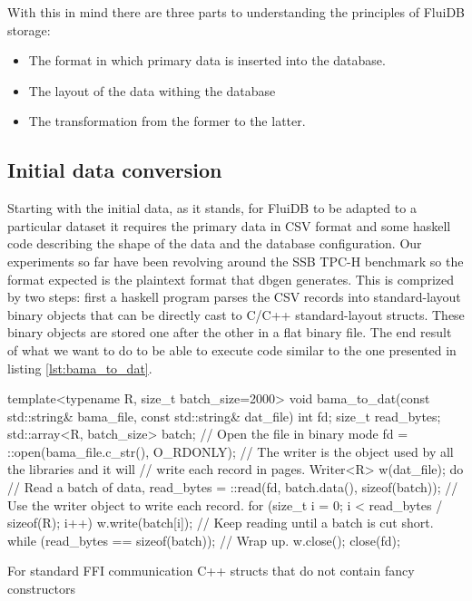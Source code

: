 With this in mind there are three parts to understanding the
principles of FluiDB storage:

\begin{itemize}
\item The format in which primary data is inserted into the database.
\item The layout of the data withing the database
\item The transformation from the former to the latter.
\end{itemize}

\subsection{Initial data conversion}

Starting with the initial data, as it stands, for FluiDB to be adapted
to a particular dataset it requires the primary data in CSV format and
some haskell code describing the shape of the data and the database
configuration. Our experiments so far have been revolving around the
SSB TPC-H benchmark so the format expected is the plaintext format
that dbgen \cite{perivolaropoulosFakedrakeSsbdbgen2021}
generates. This is comprized by two steps: first a haskell program
parses the CSV records into standard-layout binary objects that can be
directly cast to C/C++ standard-layout structs. These binary objects
are stored one after the other in a flat binary file. The end result
of what we want to do to be able to execute code similar to the one
presented in listing \ref{lst:bama_to_dat}.

\begin{code}
\begin{cppcode}
template<typename R, size_t batch_size=2000>
void bama_to_dat(const std::string& bama_file, const std::string& dat_file) {
  int fd;
  size_t read_bytes;
  std::array<R, batch_size> batch;
  // Open the file in binary mode
  fd = ::open(bama_file.c_str(), O_RDONLY);
  // The writer is the object used by all the libraries and it will
  // write each record in pages.
  Writer<R> w(dat_file);
  do {
    // Read a batch of data,
    read_bytes = ::read(fd, batch.data(), sizeof(batch));
    // Use the writer object to write each record.
    for (size_t i = 0; i < read_bytes / sizeof(R); i++) {
      w.write(batch[i]);
    }
    // Keep reading until a batch is cut short.
  } while (read_bytes == sizeof(batch));
  // Wrap up.
  w.close();
  close(fd);
}
\end{cppcode}
  \caption{\label{lst:bama_to_dat}For standard FFI communication C++
    structs that do not contain fancy constructors}
\end{code}

